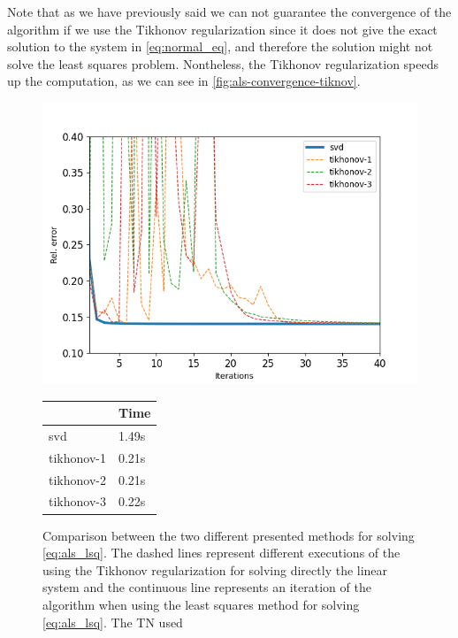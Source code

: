 \documentclass[11pt,a4paper,openright,oneside]{book}
\numberwithin{equation}{section}
\newcommand{\figref}[1]{\cref{#1}}
\newcommand{\refeq}[1]{\cref{#1}}
\begin{document}
{Note that as we have previously said we can not guarantee the convergence of the algorithm if we use the Tikhonov regularization since it does not give
the exact solution to the system in \refeq{eq:normal_eq}, and therefore the solution might not
solve the least squares problem. Nontheless, the Tikhonov regularization speeds up the 
computation, as we can see in \figref{fig:als-convergence-tiknov}.

\begin{figure}[H]
    \centering
    
   \begin{minipage}{0.7\textwidth}
    \includegraphics[width=\linewidth]{media/tikhonov-chart.png}
\end{minipage}
\begin{minipage}{0.25\textwidth}
    \centering
\begin{tabular}{l|l}
           & Time  \\ \hline
svd & 1.49s \\
tikhonov-1 & 0.21s \\
tikhonov-2 & 0.21s \\
tikhonov-3 & 0.22s
\end{tabular}
\end{minipage}
    \caption{Comparison between the
        two different presented methods for solving \ref{eq:als_lsq}.
    The dashed lines
    represent different executions of the using the Tikhonov regularization for solving
    directly the linear system and the continuous line represents an iteration of the
    algorithm when using the least squares method for solving \ref{eq:als_lsq}. The TN used
}
\end{figure}}
\end{document}
